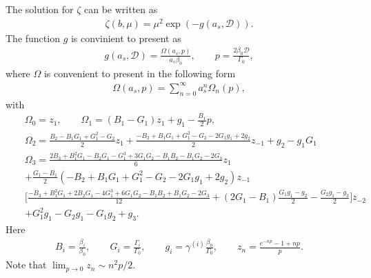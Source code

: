 \documentclass[prd,nofootinbib,eqsecnum,final]{revtex4}
\renewcommand{\(}{\left(}
\renewcommand{\)}{\right)}
\renewcommand{\[}{\left[}
\renewcommand{\]}{\right]}
\begin{document}
The solution for $\zeta$ can be written as
\begin{eqnarray}
\zeta(b,\mu)=\mu^2 \exp\(-g(a_s,\mathcal{D})\).
\end{eqnarray}
The function $g$ is convinient to present as
\begin{eqnarray}
g(a_s,\mathcal{D})=\frac{\Omega(a_s,p)}{a_s\beta_0},\qquad p=\frac{2\beta_0 \mathcal{D}}{\Gamma_0},
\end{eqnarray}
where $\Omega$ is convenient to present in the following form
\begin{eqnarray}
\Omega(a_s,p)=\sum_{n=0}^\infty a_s^n \Omega_n(p),
\end{eqnarray}
with
\begin{eqnarray*}
&&\Omega_0=z_1,\qquad \Omega_1=(B_1-G_1)z_1+g_1-\frac{B_1}{2}p,
\\
&& 
\Omega_2=\frac{B_2-B_1G_1+G_1^2-G_2}{2}z_1+\frac{-B_2+B_1G_1+G_1^2-G_2-2G_1g_1+2g_2}{2}z_{-1}+g_2-g_1G_1
\\
&&
\Omega_3=\frac{2B_3+B_1^2G_1-B_2G_1-G_1^3+3 G_1G_2-B_1B_2-B_1G_2-2G_3}{6}z_1
\\&&
+\frac{G_1-B_1}{2}\(-B_2+B_1G_1+G_1^2-G_2-2G_1g_1+2g_2\)z_{-1}
\\&&
\Big[\frac{-B_3+B_1^2G_1+2B_2G_1-4G_1^3+6G_1G_2-B_1B_2+B_1G_2-2G_3}{12}+(2G_1-B_1)\frac{G_1g_1-g_2}{2}-\frac{G_2g_1-g_3}{2}\Big]z_{-2}
\\&&
+G_1^2g_1-G_2g_1-G_1g_2+g_3.
\end{eqnarray*}
Here
\begin{eqnarray}
B_i=\frac{\beta_i}{\beta_0},\qquad G_i=\frac{\Gamma_i}{\Gamma_0},\qquad g_i=\gamma^{(i)}\frac{\beta_0}{\Gamma_0},\qquad z_n=\frac{e^{-n p}-1+n p}{p}.
\end{eqnarray}
Note that  $\lim_{p\to 0}z_n\sim n^2 p/2$.


\end{document}
